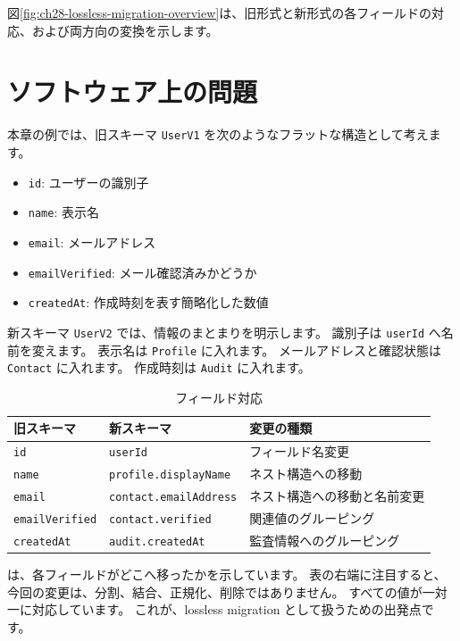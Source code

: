 図\ref{fig:ch28-lossless-migration-overview}は、旧形式と新形式の各フィールドの対応、および両方向の変換を示します。


\section{ソフトウェア上の問題}

本章の例では、旧スキーマ \texttt{UserV1} を次のようなフラットな構造として考えます。

\begin{itemize}
\item \texttt{id}: ユーザーの識別子
\item \texttt{name}: 表示名
\item \texttt{email}: メールアドレス
\item \texttt{emailVerified}: メール確認済みかどうか
\item \texttt{createdAt}: 作成時刻を表す簡略化した数値
\end{itemize}

新スキーマ \texttt{UserV2} では、情報のまとまりを明示します。
識別子は \texttt{userId} へ名前を変えます。
表示名は \texttt{Profile} に入れます。
メールアドレスと確認状態は \texttt{Contact} に入れます。
作成時刻は \texttt{Audit} に入れます。

\begin{table}[htbp]
\centering
\caption{フィールド対応}
\label{tab:ch28-field-mapping}
\begin{tabular}{lll}
\toprule
旧スキーマ & 新スキーマ & 変更の種類 \\
\midrule
\texttt{id} & \texttt{userId} & フィールド名変更 \\
\texttt{name} & \texttt{profile.displayName} & ネスト構造への移動 \\
\texttt{email} & \texttt{contact.emailAddress} & ネスト構造への移動と名前変更 \\
\texttt{emailVerified} & \texttt{contact.verified} & 関連値のグルーピング \\
\texttt{createdAt} & \texttt{audit.createdAt} & 監査情報へのグルーピング \\
\bottomrule
\end{tabular}
\end{table}

 は、各フィールドがどこへ移ったかを示しています。
表の右端に注目すると、今回の変更は、分割、結合、正規化、削除ではありません。
すべての値が一対一に対応しています。
これが、lossless migration として扱うための出発点です。

